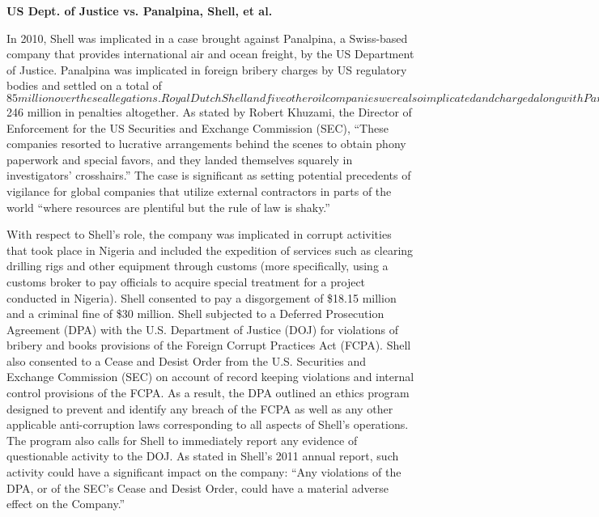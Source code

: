\textbf{US Dept. of Justice vs. Panalpina, Shell, et al.}



In 2010, Shell was implicated in a case brought against Panalpina, a Swiss-based company that provides international air and ocean freight, by the US Department of Justice. Panalpina was implicated in foreign bribery charges by US regulatory bodies and settled on a total of $85 million over these allegations. Royal Dutch Shell and five other oil companies were also implicated and charged along with Panalpina, paying a total of $246 million in penalties altogether. As stated by Robert Khuzami, the Director of Enforcement for the US Securities and Exchange Commission (SEC), “These companies resorted to lucrative arrangements behind the scenes to obtain phony paperwork and special favors, and they landed themselves squarely in investigators’ crosshairs.”  The case is significant as setting potential precedents of vigilance for global companies that utilize external contractors in parts of the world ``where resources are plentiful but the rule of law is shaky.''



With respect to Shell’s role, the company was implicated in corrupt activities that took place in Nigeria and included the expedition of services such as clearing drilling rigs and other equipment through customs (more specifically, using a customs broker to pay officials to acquire special treatment for a project conducted in Nigeria).
Shell consented to pay a disgorgement of \$18.15 million and a criminal fine of \$30 million.
Shell subjected to a Deferred Prosecution Agreement (DPA) with the U.S. Department of Justice (DOJ) for violations of bribery and books provisions of the Foreign Corrupt Practices Act (FCPA). 
Shell also consented to a Cease and Desist Order from the U.S. Securities and Exchange Commission (SEC) on account of record keeping violations and internal control provisions of the FCPA. 
As a result, the DPA outlined an ethics program designed to prevent and identify any breach of the FCPA as well as any other applicable anti-corruption laws corresponding to all aspects of Shell’s operations. 
The program also calls for Shell to immediately report any evidence of questionable activity to the DOJ. 
As stated in Shell's 2011 annual report, such activity could have a significant impact on the company: ``Any violations of the DPA, or of the SEC’s Cease and Desist Order, could have a material adverse effect on the Company.''



